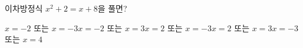 이차방정식 $x^2+2=x+8$을 풀면?
\begin{choicesii}{$x=-2$ 또는 $x=-3$}{$x=-2$ 또는 $x=3$}{$x=2$ 또는 $x=-3$}{$x=2$ 또는 $x=3$}{$x=-3$ 또는 $x=4$}\end{choicesii}
